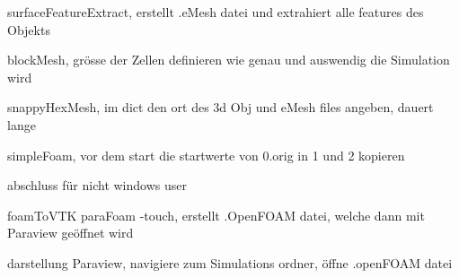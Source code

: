 surfaceFeatureExtract, erstellt .eMesh datei und extrahiert alle features des Objekts

blockMesh, grösse der Zellen definieren wie genau und auswendig die Simulation wird

snappyHexMesh, im dict den ort des 3d Obj und eMesh files angeben, dauert lange

simpleFoam, vor dem start die startwerte von 0.orig in 1 und 2 kopieren

abschluss für nicht windows user

foamToVTK
paraFoam -touch, erstellt .OpenFOAM datei, welche dann mit Paraview geöffnet wird

darstellung
Paraview, navigiere zum Simulations ordner, öffne .openFOAM datei